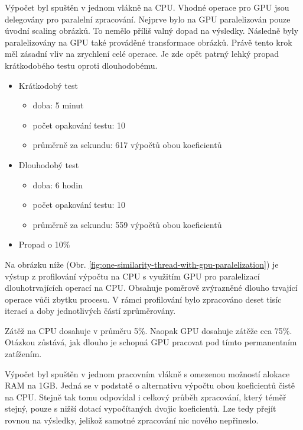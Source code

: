 Výpočet byl spuštěn v jednom vlákně na CPU. Vhodné operace pro GPU jsou delegovány pro paralelní zpracování.
Nejprve bylo na GPU paralelizován pouze úvodní scaling obrázků. To nemělo příliš valný dopad na výsledky. Následně byly paralelizovány na GPU také prováděné transformace obrázků. Právě tento krok měl zásadní vliv na zrychlení celé operace.
Je zde opět patrný lehký propad krátkodobého testu oproti dlouhodobému.
\begin{itemize}
	\setlength{\parskip}{0pt}
	\setlength{\itemsep}{0pt}
	\item {Krátkodobý test}
		\begin{itemize}
			\setlength{\parskip}{0pt}
			\setlength{\itemsep}{0pt}
			\item {doba: 5 minut}
			\item {počet opakování testu: 10}
			\item {průměrně za sekundu: 617 výpočtů obou koeficientů}
		\end{itemize}
	\item {Dlouhodobý test}
		\begin{itemize}
			\setlength{\parskip}{0pt}
			\setlength{\itemsep}{0pt}
			\item {doba: 6 hodin}
			\item {počet opakování testu: 10}
			\item {průměrně za sekundu: 559 výpočtů obou koeficientů}
		\end{itemize}
	\item {Propad o 10\%}
\end{itemize}

Na obrázku níže (Obr. \ref{fig:one-similarity-thread-with-gpu-paralelization}) je výstup z profilování výpočtu na CPU s využitím GPU pro paralelizací dlouhotrvajících operací na CPU. Obsahuje poměrově zvýrazněné dlouho trvající operace vůči zbytku procesu. V rámci profilování bylo zpracováno deset tisíc iterací a doby jednotlivých částí zprůměrovány.

Zátěž na CPU dosahuje v průměru 5\%. Naopak GPU dosahuje zátěže cca 75\%. Otázkou zůstává, jak dlouho je schopná GPU pracovat pod tímto permanentním zatížením.

Výpočet byl spuštěn v jednom pracovním vlákně s omezenou možností alokace RAM na 1GB. Jedná se v podstatě o alternativu výpočtu obou koeficientů čistě na CPU. Stejně tak tomu odpovídal i celkový průběh zpracování, který téměř stejný, pouze s nižší dotací vypočítaných dvojic koeficientů.
Lze tedy přejít rovnou na výsledky, jelikož samotné zpracování nic nového nepřineslo.

